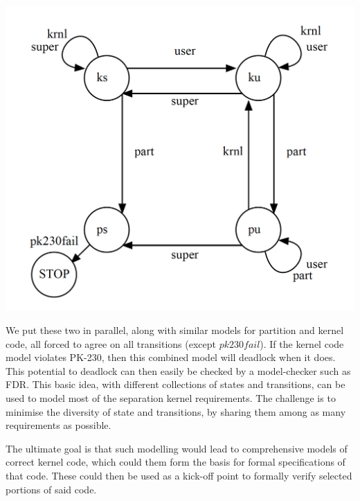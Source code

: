 \includegraphics[scale=0.35]{images/PK230LTS}

We put these two in parallel, along with similar models for partition
and kernel code, all forced to agree on all transitions (except $pk230fail$).
If the kernel code model violates PK-230, then this combined model
will deadlock when it does.
This potential to deadlock can then easily be checked by a model-checker
such as FDR.
This basic idea, with different collections of states and transitions,
can be used to model most of the separation kernel requirements.
The challenge is to minimise the diversity of state and transitions,
by sharing them among as many requirements as possible.

The ultimate goal is that such modelling would lead to comprehensive models
of correct kernel code,
which could them form the basis for formal specifications of that code.
These could then be used as a kick-off point to formally verify selected
portions of said code.



